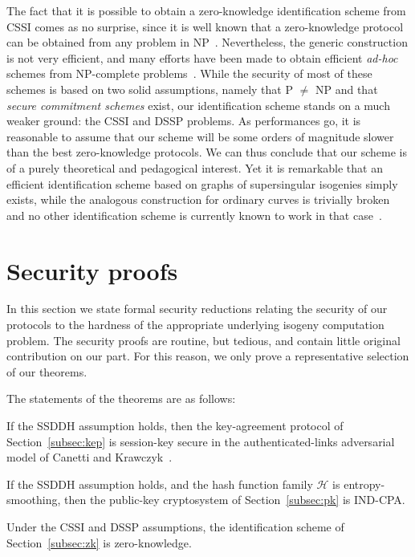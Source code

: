 \documentclass[jmc]{degruyter-journal-a}
\theoremstyle{definition}
\begin{document}
The fact that it is possible to obtain a zero-knowledge identification
scheme from CSSI comes as no surprise, since it is well known that a
zero-knowledge protocol can be obtained from any problem in
NP~\cite{goldreich+micali+widgerson91}. Nevertheless, the generic
construction is not very efficient, and many efforts have been made to
obtain efficient \emph{ad-hoc} schemes from NP-complete
problems~\cite{shamir89-pkp,stern94-CLE,stern94-SD,pointcheval95-pp}. While
the security of most of these schemes is based on two solid
assumptions, namely that P $\ne$ NP and that \emph{secure commitment
  schemes} exist, our identification scheme stands on a much
weaker ground: the CSSI and DSSP problems. As performances go, it is
reasonable to assume that our scheme will be some orders of magnitude
slower than the best zero-knowledge protocols. We can thus conclude
that our scheme is of a purely theoretical and pedagogical interest.
Yet it is remarkable that an efficient identification scheme based on
graphs of supersingular isogenies simply exists, while the analogous
construction for ordinary curves is trivially broken and no other
identification scheme is currently known to work in that
case~\cite{Stol}.

\section{Security proofs}\label{sec:proof}



In this section we state formal security reductions relating the
security of our protocols to the hardness of the appropriate
underlying isogeny computation problem. The security proofs are
routine, but tedious, and contain little original contribution on
our part. For this reason, we only prove a representative selection
of our theorems.

The statements of the theorems are as follows:

\begin{theorem}\label{thm:kep-proof}
If the SSDDH assumption holds, then the key-agreement protocol of
Section~\ref{subsec:kep} is session-key secure in the
authenticated-links adversarial model of Canetti and
Krawczyk~\cite{canetti}.
\end{theorem}
\begin{theorem}\label{thm:pk-proof}
If the SSDDH assumption holds, and the hash function family
$\mathcal{H}$ is entropy-smoothing, then the public-key cryptosystem
of Section~\ref{subsec:pk} is IND-CPA.
\end{theorem}
\begin{theorem}\label{thm:zk-proof}
  Under the CSSI and DSSP assumptions, the identification scheme of
  Section~\ref{subsec:zk} is zero-knowledge.
\end{theorem}
\end{document}
